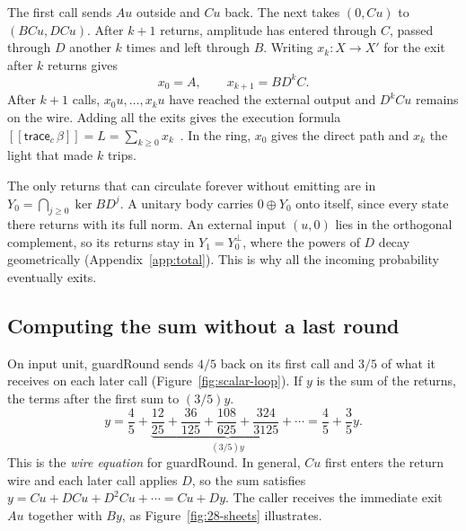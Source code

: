 \documentclass[acmsmall,screen,review,anonymous,nonacm]{acmart}
\newcommand{\storyinlineface}{\small\ttfamily}
\newcommand{\code}[1]{\textnormal{\storyinlineface #1}}
\providecommand{\llbracket}{[\![}
\providecommand{\rrbracket}{]\!]}
\newcommand{\sem}[1]{\llbracket #1 \rrbracket}
\numberwithin{equation}{section}
\begin{document}
The first call sends $Au$ outside and $Cu$ back. The next takes $(0,Cu)$ to $(BCu,DCu)$. After $k+1$ returns, amplitude has entered through $C$, passed through $D$ another $k$ times and left through $B$. Writing $x_k:X\to X'$ for the exit after $k$ returns gives
\begin{equation}\label{eq:exits}
 x_0=A,\qquad x_{k+1}=BD^kC.
\end{equation}
After $k+1$ calls, $x_0u,\ldots,x_ku$ have reached the external output and
$D^kCu$ remains on the wire. Adding all the exits gives the execution formula
$\sem{\mathsf{trace}_c\,\beta}=L=\sum_{k\ge0}x_k$~\cite{Girard95GoI,AbramskyHaghverdiScott02GoI}.
In the ring, $x_0$ gives the direct path and $x_k$ the light that made $k$ trips.


The only returns that can circulate forever without emitting are in $Y_0=\bigcap_{j\ge0}\ker BD^j$. A unitary body carries $0\oplus Y_0$ onto itself, since every state there returns with its full norm. An external input $(u,0)$ lies in the orthogonal complement, so its returns stay in $Y_1=Y_0^\perp$, where the powers of $D$ decay geometrically (Appendix~\ref{app:total}). This is why all the incoming probability eventually exits.

\subsection{Computing the sum without a last round}

On input \code{unit}, \code{guardRound} sends $4/5$ back on its first call
and $3/5$ of what it receives on each later call (Figure~\ref{fig:scalar-loop}).
If $y$ is the sum of the returns, the terms after the first sum to $(3/5)y$.
\[
 y=\frac45+
   \underbrace{\frac{12}{25}+\frac{36}{125}+\frac{108}{625}+
               \frac{324}{3125}+\cdots}_{(3/5)y}
   =\frac45+\frac35y.
\]
This is the \emph{wire equation} for \code{guardRound}. In general, $Cu$ first
enters the return wire and each later call applies $D$, so the sum satisfies
$y=Cu+DCu+D^2Cu+\cdots=Cu+Dy$. The caller receives the immediate exit
$Au$ together with $By$, as Figure~\ref{fig:28-sheets} illustrates.
\end{document}
